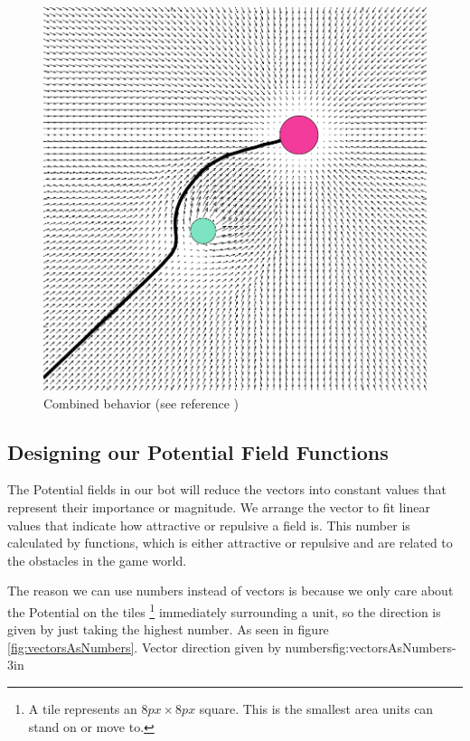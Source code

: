 	\begin{figure}[H]
		\begin{center}
			\includegraphics[scale=0.3]{Figures/Potentialfields/combined.png}
			\caption{Combined behavior  (see reference \cite{pft})}\label{fig:combinedbehavior}
			\end{center}
	\end{figure}
		
	
	\subsection{Designing our Potential Field Functions}		
		The Potential fields in our bot will reduce the vectors into constant values that represent their importance or magnitude. We arrange the vector to fit linear values that indicate how attractive or repulsive a field is. 
		This number is calculated by functions, which is either attractive or repulsive and are related to the obstacles in the game world. 
		
		The reason we can use numbers instead of vectors is because we only care about the Potential on the tiles 
		\footnote{A tile represents an $8px \times 8px$ square. 
		This is the smallest area units can stand on or move to.} 
		immediately surrounding a unit, so the direction is given by just taking the highest number. As seen in figure \ref{fig:vectorsAsNumbers}.
		{Vector direction given by numbers}{fig:vectorsAsNumbers}{-3in}
		\\
		\pagebreak
